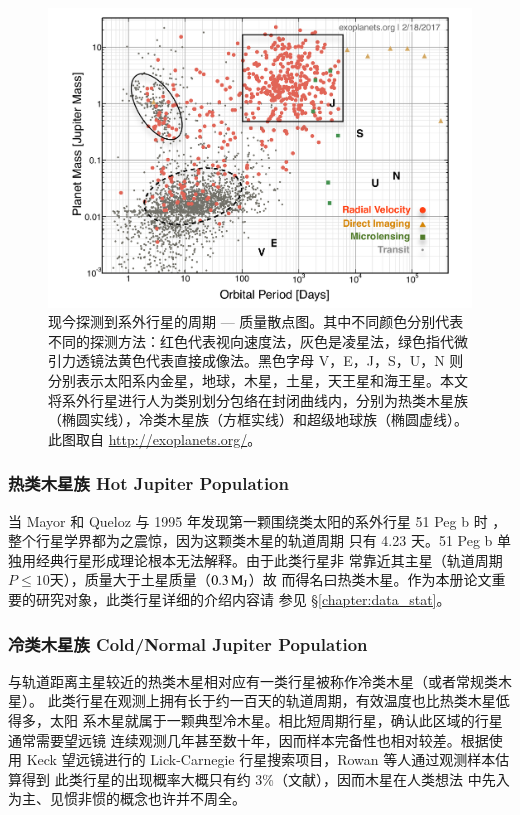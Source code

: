 \begin{figure}[t]
\centering
\includegraphics[width=1.0\textwidth]{figures/chapter1/fig13_nasaexompplot.pdf}
\caption{现今探测到系外行星的周期 --- 质量散点图。其中不同颜色分别代表不同的探测方法：红色代表视向速度法，灰色是凌星法，绿色指代微引力透镜法黄色代表直接成像法。黑色字母 V，E，J，S，U，N 则分别表示太阳系内金星，地球，木星，土星，天王星和海王星。本文将系外行星进行人为类别划分包络在封闭曲线内，分别为热类木星族（椭圆实线），冷类木星族（方框实线）和超级地球族（椭圆虚线）。此图取自 \url{http://exoplanets.org/}。}
\label{fig:exomassper}
\end{figure}

\subsubsection{热类木星族 Hot Jupiter Population}

当 Mayor 和 Queloz 与 1995 年发现第一颗围绕类太阳的系外行星 51 Peg b 时
\cite{MayorQueloz1995}，整个行星学界都为之震惊，因为这颗类木星的轨道周期
只有 4.23 天。51 Peg b 单独用经典行星形成理论根本无法解释。由于此类行星非
常靠近其主星（轨道周期 $P \le10 $天），质量大于土星质量（$0.3\,\mathrm{M}_\mathrm{J}$）故
而得名曰热类木星。作为本册论文重要的研究对象，此类行星详细的介绍内容请
参见 \S \ref{chapter:data_stat}。


\subsubsection{冷类木星族  Cold/Normal Jupiter Population}

与轨道距离主星较近的热类木星相对应有一类行星被称作冷类木星（或者常规类木星）。
此类行星在观测上拥有长于约一百天的轨道周期，有效温度也比热类木星低得多，太阳
系木星就属于一颗典型冷木星。相比短周期行星，确认此区域的行星通常需要望远镜
连续观测几年甚至数十年，因而样本完备性也相对较差\cite{Cumming2008}。根据使用
 Keck 望远镜进行的 Lick-Carnegie 行星搜索项目，Rowan 等人通过观测样本估算得到
此类行星的出现概率大概只有约 3\%（文献），因而木星在人类想法
中先入为主、见惯非惯的概念也许并不周全。

